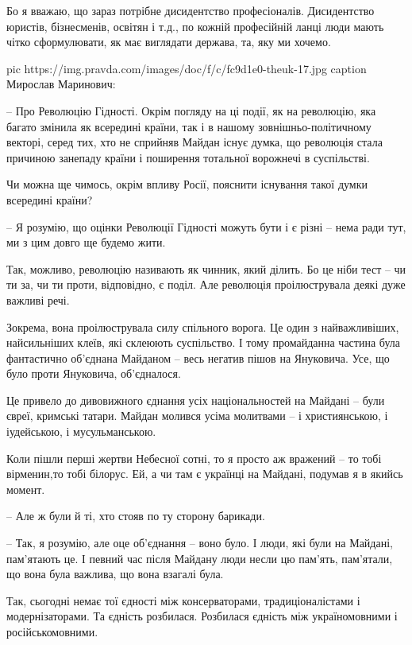 Бо я вважаю, що зараз потрібне дисидентство професіоналів. Дисидентство
юристів, бізнесменів, освітян і т.д., по кожній професійній ланці люди мають
чітко сформулювати, як має виглядати держава, та, яку ми хочемо.

\ifcmt
pic https://img.pravda.com/images/doc/f/c/fc9d1e0-theuk-17.jpg
caption Мирослав Маринович: 
\fi

– Про Революцію Гідності. Окрім погляду на ці події, як на революцію, яка
багато змінила як всередині країни, так і в нашому зовнішньо-політичному
векторі, серед тих, хто не сприйняв Майдан існує думка, що революція стала
причиною занепаду країни і поширення тотальної ворожнечі в суспільстві. 

Чи можна ще чимось, окрім впливу Росії, пояснити існування такої думки
всередині країни?  

– Я розумію, що оцінки Революції Гідності можуть бути і є різні – нема ради
тут, ми з цим довго ще будемо жити. 

Так, можливо, революцію називають як чинник, який ділить. Бо це ніби тест – чи
ти за, чи ти проти, відповідно, є поділ. Але революція проілюструвала деякі
дуже важливі речі. 

Зокрема, вона проілюструвала силу спільного ворога. Це один з найважливіших,
найсильніших клеїв, які склеюють суспільство. І тому промайданна частина була
фантастично об’єднана Майданом – весь негатив пішов на Януковича. Усе, що було
проти Януковича, об’єдналося. 

Це привело до дивовижного єднання усіх національностей на Майдані – були євреї,
кримські татари. Майдан молився усіма молитвами – і християнською, і
іудейською, і мусульманською. 

Коли пішли перші жертви Небесної сотні, то я просто аж вражений – то тобі
вірменин,то тобі білорус. Ей, а чи там є українці на Майдані, подумав я в
якийсь момент. 

– Але ж були й ті, хто стояв по ту сторону барикади.

– Так, я розумію, але оце об’єднання – воно було. І люди, які були на Майдані,
пам’ятають це. І певний час після Майдану люди несли цю пам'ять, пам’ятали, що
вона була важлива, що вона взагалі була. 

Так, сьогодні немає тої єдності між консерваторами, традиціоналістами і
модернізаторами. Та єдність розбилася. Розбилася єдність між україномовними і
російськомовними. 

